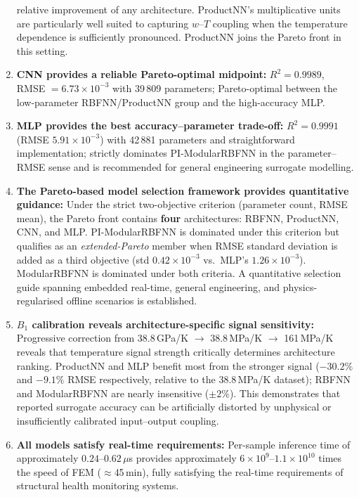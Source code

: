 \documentclass[a4paper,12pt]{report}
\begin{document}
\begin{CJK}{UTF8}{gbsn}
\begin{enumerate}
    relative improvement of any architecture. ProductNN's multiplicative units are
    particularly well suited to capturing $w$--$T$ coupling when the temperature
    dependence is sufficiently pronounced. ProductNN joins the Pareto front in this setting.
  \item \textbf{CNN provides a reliable Pareto-optimal midpoint:}
    $R^2 = 0.9989$, RMSE $= 6.73 \times 10^{-3}$ with 39\,809 parameters; Pareto-optimal
    between the low-parameter RBFNN/ProductNN group and the high-accuracy MLP.
  \item \textbf{MLP provides the best accuracy--parameter trade-off:}
    $R^2 = 0.9991$ (RMSE $5.91 \times 10^{-3}$) with 42\,881 parameters and
    straightforward implementation; strictly dominates PI-ModularRBFNN in the
    parameter--RMSE sense and is recommended for general engineering surrogate modelling.
  \item \textbf{The Pareto-based model selection framework provides quantitative guidance:}
    Under the strict two-objective criterion (parameter count, RMSE mean), the Pareto
    front contains \textbf{four} architectures: RBFNN, ProductNN, CNN, and MLP.
    PI-ModularRBFNN is dominated under this criterion but qualifies as an
    \emph{extended-Pareto} member when RMSE standard deviation is added as a third
    objective (std $0.42\times10^{-3}$ vs.\ MLP's $1.26\times10^{-3}$).
    ModularRBFNN is dominated under both criteria. A quantitative selection guide
    spanning embedded real-time, general engineering, and physics-regularised offline
    scenarios is established.
  \item \textbf{$B_1$ calibration reveals architecture-specific signal sensitivity:}
    Progressive correction from 38.8\,GPa/K $\to$ 38.8\,MPa/K $\to$ 161\,MPa/K
    reveals that temperature signal strength critically determines architecture ranking.
    ProductNN and MLP benefit most from the stronger signal ($-30.2\%$ and $-9.1\%$
    RMSE respectively, relative to the 38.8\,MPa/K dataset); RBFNN and ModularRBFNN are
    nearly insensitive ($\pm 2\%$).
    This demonstrates that reported surrogate accuracy can be artificially distorted
    by unphysical or insufficiently calibrated input--output coupling.
  \item \textbf{All models satisfy real-time requirements:} Per-sample inference time of
    approximately $0.24$--$0.62\,\mu$s provides approximately $6\times10^{9}$--$1.1\times10^{10}$ times
    the speed of FEM ($\approx$45\,min), fully satisfying the real-time requirements
    of structural health monitoring systems.

\end{enumerate}
\end{CJK}
\end{document}
